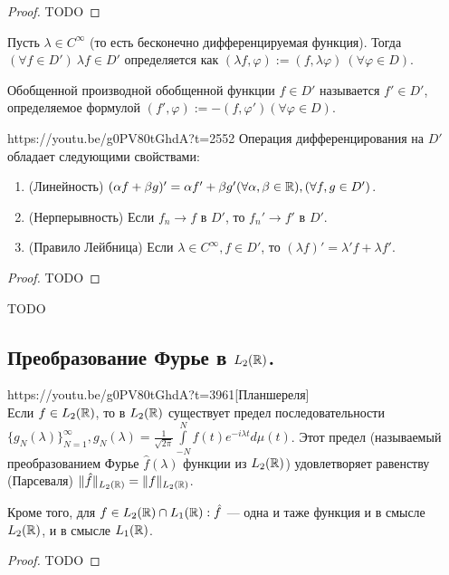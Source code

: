 \begin{proof}
	TODO
\end{proof}

\begin{Def}
	Пусть $\lambda\in C^\infty$ (то есть бесконечно дифференцируемая функция). Тогда $(\forall f\in D')\ \lambda f\in D'$ определяется как $(\lambda f,\varphi):=(f,\lambda\varphi)\ (\forall\varphi\in D)$.
\end{Def}

\begin{Def}
	Обобщенной производной обобщенной функции $f\in D'$ называется $f'\in D'$, определяемое формулой $(f',\varphi):=-(f,\varphi') (\forall\varphi\in D)$.
\end{Def}

\begin{linkthm}{https://youtu.be/g0PV80tGhdA?t=2552}
	Операция дифференцирования на $D'$ обладает следующими свойствами:
	\begin{enumerate}
		\item (Линейность) $(\alpha f+\beta g)'=\alpha f'+\beta g'(\forall\alpha,\beta\in\mathbb{R}),(\forall f,g\in D')$.
		\item (Нерперывность) Если $f_n\to f$ в $D'$, то $f_n'\to f'$ в $D'$.
		\item (Правило Лейбница) Если $\lambda\in C^\infty,f\in D'$, то $(\lambda f)'=\lambda' f+\lambda f'$.
	\end{enumerate}
\end{linkthm}

\begin{proof}
	TODO
\end{proof}

\begin{example}
TODO
\end{example}

\subsection{Преобразование Фурье в $L_2(\mathbb{R})$.}
\begin{linkthm}{https://youtu.be/g0PV80tGhdA?t=3961}[Планшереля]\ \\
	Если $f\in L_2(\mathbb{R})$, то в $L_2(\mathbb{R})$ существует предел последовательности $\{g_N(\lambda)\}_{N=1}^\infty, g_N(\lambda)=\frac{1}{\sqrt{2\pi}}\int\limits_{-N}^N f(t)e^{-i\lambda t}d\mu(t)$. Этот предел (называемый преобразованием Фурье $\hat{f}(\lambda)$ функции из $L_2(\mathbb{R})$) удовлетворяет равенству (Парсеваля) $\|\hat{f}\|_{L_2(\mathbb{R})}=\|f\|_{L_2(\mathbb{R})}$.
	
	Кроме того, для $f\in L_2(\mathbb{R})\cap L_1(\mathbb{R}): \hat{f}$ --- одна и таже функция и в смысле $L_2(\mathbb{R})$, и в смысле $L_1(\mathbb{R})$.
\end{linkthm}

\begin{proof}
TODO
\end{proof}












